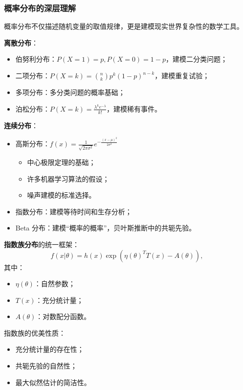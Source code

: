 \subsubsection{概率分布的深层理解}

概率分布不仅描述随机变量的取值规律，更是建模现实世界复杂性的数学工具。

\textbf{离散分布}：
\begin{itemize}
  \item 伯努利分布：$P(X=1) = p, P(X=0) = 1-p$，建模二分类问题；
  \item 二项分布：$P(X=k) = \binom{n}{k}p^k(1-p)^{n-k}$，建模重复试验；
  \item 多项分布：多分类问题的概率基础；
  \item 泊松分布：$P(X=k) = \frac{\lambda^k e^{-\lambda}}{k!}$，建模稀有事件。
\end{itemize}

\textbf{连续分布}：
\begin{itemize}
  \item 高斯分布：$f(x) = \frac{1}{\sqrt{2\pi\sigma^2}}e^{-\frac{(x-\mu)^2}{2\sigma^2}}$
    \begin{itemize}
      \item 中心极限定理的基础；
      \item 许多机器学习算法的假设；
      \item 噪声建模的标准选择。
    \end{itemize}
  \item 指数分布：建模等待时间和生存分析；
  \item Beta 分布：建模“概率的概率”，贝叶斯推断中的共轭先验。
\end{itemize}

\textbf{指数族分布}的统一框架：
$$
f(x|\theta) = h(x)\exp(\eta(\theta)^T T(x) - A(\theta)),
$$
其中：
\begin{itemize}
  \item $\eta(\theta)$：自然参数；
  \item $T(x)$：充分统计量；
  \item $A(\theta)$：对数配分函数。
\end{itemize}

指数族的优美性质：
\begin{itemize}
  \item 充分统计量的存在性；
  \item 共轭先验的自然性；
  \item 最大似然估计的简洁性。
\end{itemize}

